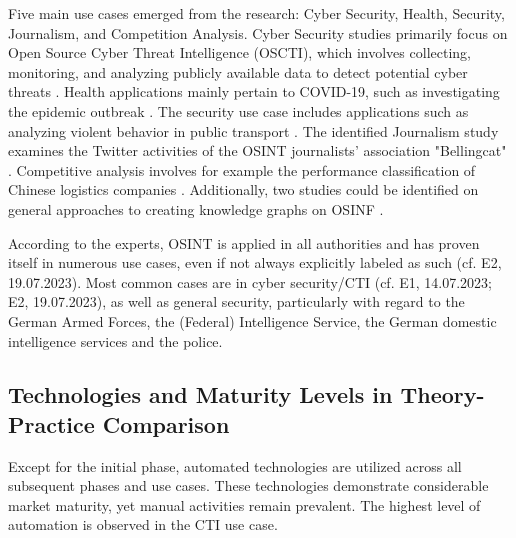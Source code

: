 \documentclass[10pt]{article}
\begin{document}
Five main use cases emerged from the research: Cyber Security, Health, Security, Journalism,
and Competition Analysis. Cyber Security studies primarily focus on Open Source Cyber Threat
Intelligence (OSCTI), which involves collecting, monitoring, and analyzing publicly available
data to detect potential cyber threats \cite{Ahuja.2022,AlDmour.2023}.
Health applications mainly pertain to COVID-19, such as investigating the epidemic outbreak \cite{Kpozehouen.2020,Thamtono.2021}.
The security use case includes applications such as
analyzing violent behavior in public transport \cite{Nobili.2021}. The identified Journalism study examines the
Twitter activities of the OSINT journalists' association "Bellingcat" \cite{Bar.2023}. Competitive analysis
involves for example the performance classification of Chinese logistics companies \cite{Tao.2023}. Additionally, two
studies could be identified on general approaches to creating knowledge graphs on OSINF \cite{Hu.2023,Ma.2022}.

According to the experts, OSINT is applied in all authorities and has proven itself
in numerous use cases, even if not always explicitly labeled as such (cf. E2, 19.07.2023).
Most common cases are in cyber security/CTI (cf. E1, 14.07.2023; E2, 19.07.2023), as well as general security,
particularly with regard to the German Armed Forces, the (Federal) Intelligence Service,
the Ger­man do­mes­tic in­tel­li­gence ser­vices and the police.

\subsection{Technologies and Maturity Levels in Theory-Practice Comparison}

Except for the initial phase, automated technologies are utilized across all subsequent phases and use cases.
These technologies demonstrate considerable market maturity, yet manual activities remain prevalent.
The highest level of automation is observed in the CTI use case.
\end{document}

